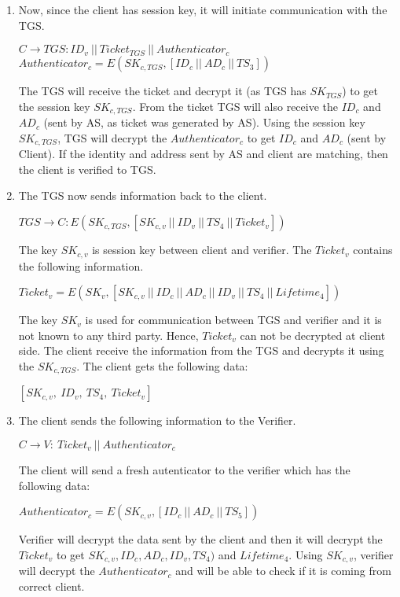 \documentclass[11pt]{article}
\begin{document}
\begin{enumerate}
    \item Now, since the client has session key, it will initiate communication with the TGS.
    \begin{center}
        $C \rightarrow TGS: {ID}_v \ || \ {Ticket}_{TGS} \ || \ {Authenticator}_c$\\
        \vspace{1mm}
        ${Authenticator}_c = E({SK}_{c,TGS}, [{ID}_c \ || \ {AD}_c \ || \ {TS}_3])$
    \end{center}
    The TGS will receive the ticket and decrypt it (as TGS has ${SK}_{TGS}$) to get the session key ${SK}_{c,TGS}$. From the ticket TGS will also receive the ${ID}_c$ and ${AD}_c$ (sent by AS, as ticket was generated by AS). Using the session key ${SK}_{c,TGS}$, TGS will decrypt the ${Authenticator}_c$ to get ${ID}_c$ and ${AD}_c$ (sent by Client). If the identity and address sent by AS and client are matching, then the client is verified to TGS.

    \item The TGS now sends information back to the client. 
    \begin{center}
        $TGS \rightarrow C: E({SK}_{c,TGS}, [{SK}_{c,v} \ || \ {ID}_v \ || \ {TS}_4 \ || \ {Ticket}_v])$
    \end{center}
    The key ${SK}_{c,v}$ is session key between client and verifier. The ${Ticket}_v$ contains the following information.
    \begin{center}
        ${Ticket}_v = E({SK}_v, [{SK}_{c,v} \ || \ {ID}_c \ || \ {AD}_c \ || \ {ID}_v \ || \ {TS}_4 \ || \ {Lifetime}_4])$
    \end{center}
    The key ${SK}_v$ is used for communication between TGS and verifier and it is not known to any third party. Hence, ${Ticket}_v$ can not be decrypted at client side. The client receive the information from the TGS and decrypts it using the ${SK}_{c,TGS}$. The client gets the following data:
    \begin{center}
        $[{SK}_{c,v}, \ {ID}_v, \ {TS}_4, \ {Ticket}_v]$
    \end{center}

    \item The client sends the following information to the Verifier.
    \begin{center}
        $C \rightarrow V: \ {Ticket}_v \ || \ {Authenticator}_c$
    \end{center}
    The client will send a fresh autenticator to the verifier which has the following data:
    \begin{center}
        ${Authenticator}_c = E({SK}_{c,v}, [{ID}_c \ || \ {AD}_c \ || \ {TS}_5])$
    \end{center}
    Verifier will decrypt the data sent by the client and then it will decrypt the ${Ticket}_v$ to get ${SK}_{c,v}, {ID}_c, {AD}_c, {ID}_v, {TS}_4)$ and ${Lifetime}_4$. Using ${SK}_{c,v}$, verifier will decrypt the ${Authenticator}_c$ and will be able to check if it is coming from correct client.


\end{enumerate}
\end{document}
